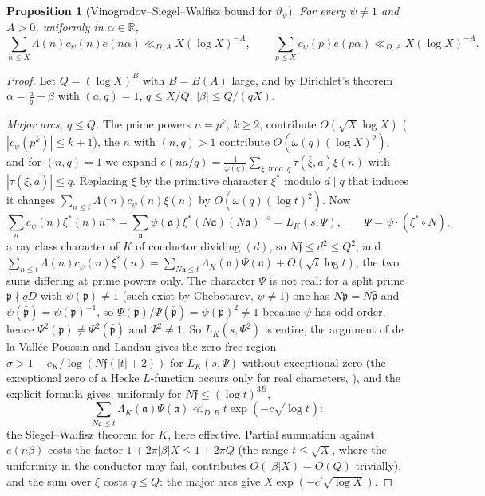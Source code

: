 ﻿\documentclass[11pt]{amsart}
\newtheorem{proposition}[theorem]{Proposition}
\theoremstyle{remark}
\newcommand{\vt}{\vartheta}
\begin{document}
\begin{proposition}[Vinogradov--Siegel--Walfisz bound for $\vt_\psi$]\label{prop:VSW}
For every $\psi\ne1$ and $A>0$, uniformly in $\alpha\in\mathbb R$,
\[
\sum_{n\le X}\Lambda(n)c_\psi(n)e(n\alpha)\ll_{D,A}X(\log X)^{-A},\qquad \sum_{p\le X}c_\psi(p)e(p\alpha)\ll_{D,A}X(\log X)^{-A}.
\]
\end{proposition}
\begin{proof}
Let $Q=(\log X)^B$ with $B=B(A)$ large, and by Dirichlet's theorem $\alpha=\frac aq+\beta$ with $(a,q)=1$, $q\le X/Q$, $|\beta|\le Q/(qX)$.

\emph{Major arcs, $q\le Q$.} The prime powers $n=p^k$, $k\ge2$, contribute $O(\sqrt X\log X)$ ($|c_\psi(p^k)|\le k+1$), the $n$ with $(n,q)>1$ contribute $O(\omega(q)(\log X)^2)$, and for $(n,q)=1$ we expand $e(na/q)=\frac1{\varphi(q)}\sum_{\xi\bmod q}\tau(\bar\xi,a)\xi(n)$ with $|\tau(\bar\xi,a)|\le q$. Replacing $\xi$ by the primitive character $\xi^*$ modulo $d\mid q$ that induces it changes $\sum_{n\le t}\Lambda(n)c_\psi(n)\xi(n)$ by $O(\omega(q)(\log t)^2)$. Now
\[
\sum_nc_\psi(n)\xi^*(n)n^{-s}=\sum_{\mathfrak a}\psi(\mathfrak a)\xi^*(N\mathfrak a)(N\mathfrak a)^{-s}=L_K(s,\Psi),\qquad\Psi=\psi\cdot(\xi^*\circ N),
\]
a ray class character of $K$ of conductor dividing $(d)$, so $N\mathfrak f\le d^2\le Q^2$, and $\sum_{n\le t}\Lambda(n)c_\psi(n)\xi^*(n)=\sum_{N\mathfrak a\le t}\Lambda_K(\mathfrak a)\Psi(\mathfrak a)+O(\sqrt t\log t)$, the two sums differing at prime powers only. The character $\Psi$ is not real: for a split prime $\mathfrak p\nmid qD$ with $\psi(\mathfrak p)\ne1$ (such exist by Chebotarev, $\psi\ne1$) one has $N\mathfrak p=N\bar{\mathfrak p}$ and $\psi(\bar{\mathfrak p})=\psi(\mathfrak p)^{-1}$, so $\Psi(\mathfrak p)/\Psi(\bar{\mathfrak p})=\psi(\mathfrak p)^2\ne1$ because $\psi$ has odd order, hence $\Psi^2(\mathfrak p)\ne\Psi^2(\bar{\mathfrak p})$ and $\Psi^2\ne1$. So $L_K(s,\Psi^2)$ is entire, the argument of de la Vall\'ee Poussin and Landau gives the zero-free region $\sigma>1-c_K/\log(N\mathfrak f(|t|+2))$ for $L_K(s,\Psi)$ without exceptional zero (the exceptional zero of a Hecke $L$-function occurs only for real characters, \cite[Chapter~5]{IK}), and the explicit formula gives, uniformly for $N\mathfrak f\le(\log t)^{3B}$,
\[
\sum_{N\mathfrak a\le t}\Lambda_K(\mathfrak a)\Psi(\mathfrak a)\ll_{D,B}t\exp(-c\sqrt{\log t}):
\]
the Siegel--Walfisz theorem for $K$, here effective. Partial summation against $e(n\beta)$ costs the factor $1+2\pi|\beta|X\le1+2\pi Q$ (the range $t\le\sqrt X$, where the uniformity in the conductor may fail, contributes $O(|\beta|X)=O(Q)$ trivially), and the sum over $\xi$ costs $q\le Q$: the major arcs give $X\exp(-c'\sqrt{\log X})$.


\end{proof}
\end{document}
